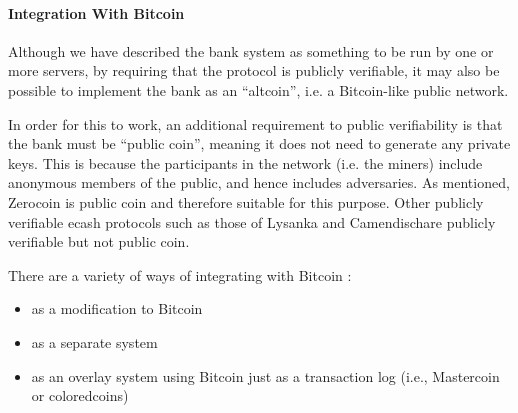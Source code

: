 \paragraph{Integration With Bitcoin}
Although we have described the bank system as something to be run by one or more servers, by requiring that the protocol is publicly verifiable, it may also be possible to implement the bank as an ``altcoin'', i.e. a Bitcoin-like public network.

In order for this to work, an additional requirement to public verifiability is that the bank must be ``public coin'', meaning it does not need to generate any private keys. This is because the participants in the network (i.e. the miners) include anonymous members of the public, and hence includes adversaries. As mentioned, Zerocoin is public coin and therefore suitable for this purpose. Other publicly verifiable ecash protocols such as those of Lysanka and Camendisch\citeme are publicly verifiable but not public coin.

There are a variety of ways of integrating with Bitcoin :
\begin{itemize}
\item as a modification to Bitcoin
\item as a separate system
\item as an overlay system using Bitcoin just as a transaction log (i.e., Mastercoin or coloredcoins)
\end{itemize}
